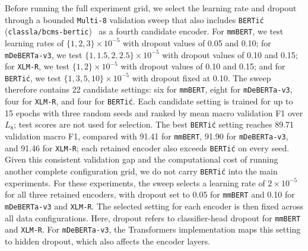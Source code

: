 \documentclass{article}
\begin{document}
Before running the full experiment grid, we select the learning rate and dropout through a bounded \texttt{Multi-8} validation sweep that also includes \texttt{BERTi\'{c}} (\texttt{classla/bcms-bertic})~\parencite{ljubesic-lauc-2021-bertic} as a fourth candidate encoder.
For \texttt{mmBERT}, we test learning rates of $\{1,2,3\} \times 10^{-5}$ with dropout values of 0.05 and 0.10;
for \texttt{mDeBERTa-v3}, we test $\{1,1.5,2,2.5\} \times 10^{-5}$ with dropout values of 0.10 and 0.15;
for \texttt{XLM-R}, we test $\{1,2\} \times 10^{-5}$ with dropout values of 0.10 and 0.15;
and for \texttt{BERTi\'{c}}, we test $\{1,3,5,10\} \times 10^{-5}$ with dropout fixed at 0.10.
The sweep therefore contains 22 candidate settings: six for \texttt{mmBERT}, eight for \texttt{mDeBERTa-v3}, four for \texttt{XLM-R}, and four for \texttt{BERTi\'{c}}.
Each candidate setting is trained for up to 15 epochs with three random seeds and ranked by mean macro validation F1 over $L_8$; test scores are not used for selection.
The best \texttt{BERTi\'{c}} setting reaches 89.71 validation macro F1, compared with 91.41 for \texttt{mmBERT}, 91.90 for \texttt{mDeBERTa-v3}, and 91.46 for \texttt{XLM-R}; each retained encoder also exceeds \texttt{BERTi\'{c}} on every seed.
Given this consistent validation gap and the computational cost of running another complete configuration grid, we do not carry \texttt{BERTi\'{c}} into the main experiments.
For these experiments, the sweep selects a learning rate of $2 \times 10^{-5}$ for all three retained encoders, with dropout set to 0.05 for \texttt{mmBERT} and 0.10 for \texttt{mDeBERTa-v3} and \texttt{XLM-R}.
The selected setting for each encoder is then fixed across all data configurations.
Here, dropout refers to classifier-head dropout for \texttt{mmBERT} and \texttt{XLM-R}. For \texttt{mDeBERTa-v3}, the Transformers implementation maps this setting to hidden dropout, which also affects the encoder layers.
\end{document}
